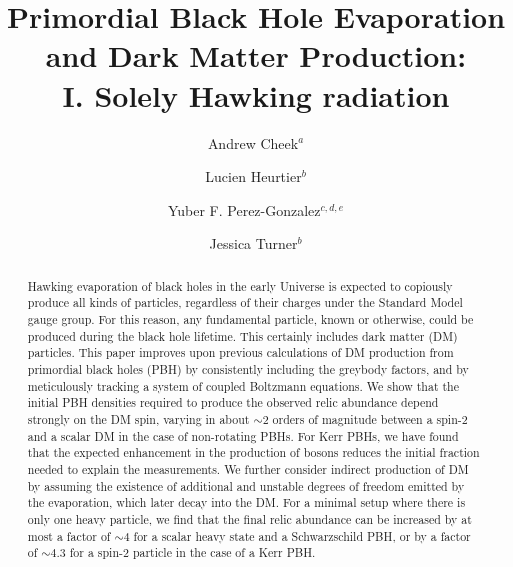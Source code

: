 \documentclass[aps,prd,reprint,twocolumn,preprintnumbers,floatfix,nofootinbib]{revtex4-1}
\begin{document}
\sloppy  


\vspace*{1mm}


\title{Primordial Black Hole Evaporation and Dark Matter Production:\\
I. Solely Hawking radiation}

\author{Andrew Cheek$^{a}$}
\author{Lucien Heurtier$^{b}$}
\author{Yuber F. Perez-Gonzalez$^{c, d, e}$}
\author{Jessica Turner$^{b}$}



\begin{abstract}
Hawking evaporation of black holes in the early Universe is expected to copiously produce all kinds of particles, regardless of their charges under the Standard Model  gauge group. For this reason, any fundamental particle, known or otherwise, could be produced during the black hole lifetime. This certainly includes dark matter (DM) particles. This paper improves upon previous calculations of DM production from primordial black holes (PBH) by  consistently including the greybody factors, and by  meticulously tracking a system of coupled Boltzmann equations. We show that the initial PBH densities required to produce the observed relic abundance depend strongly on the DM spin, varying in about $\sim 2$ orders of magnitude between a spin-2 and a scalar DM in the case of non-rotating PBHs. For Kerr PBHs, we have found that the expected enhancement in the production of bosons reduces the initial fraction needed to explain the measurements. We further consider indirect production of DM by assuming the existence of additional and unstable degrees of freedom emitted by the evaporation, which later decay into the DM. For a minimal setup where there is only one heavy particle, we find that the final relic abundance can be increased by at most a factor of $\sim 4$ for a scalar heavy state and a Schwarzschild PBH, or by a factor of $\sim 4.3$ for a spin-2 particle in the case of a Kerr PBH. \href{https://github.com/earlyuniverse/ulysses}{\faGithub}
\end{abstract}
\end{document}
